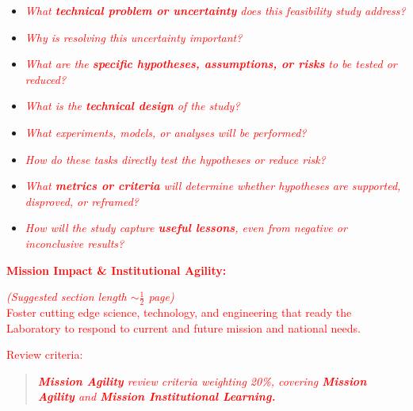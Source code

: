 \begin{itemize}[noitemsep,nolistsep]
    \item \textcolor{red}{\textit{What \textbf{technical problem or uncertainty} does this feasibility study address?}}
    \item \textcolor{red}{\textit{Why is resolving this uncertainty important?}}
    \item \textcolor{red}{\textit{What are the \textbf{specific hypotheses, assumptions, or risks} to be tested or reduced?}}
    \item \textcolor{red}{\textit{What is the \textbf{technical design} of the study?}}
    \item \textcolor{red}{\textit{What experiments, models, or analyses will be performed?}}
    \item \textcolor{red}{\textit{How do these tasks directly test the hypotheses or reduce risk?}}
    \item \textcolor{red}{\textit{What \textbf{metrics or criteria} will determine whether hypotheses are supported, disproved, or reframed?}}
    \item \textcolor{red}{\textit{How will the study capture \textbf{useful lessons}, even from negative or inconclusive results?}}
\end{itemize}
\vspace*{\baselineskip}

\textcolor{red}{\textbf{Mission Impact \& Institutional Agility:}}
\vspace*{0.5\baselineskip}

\textcolor{red}{\textit{(Suggested section length \(\sim \)$\frac{1}{2}$ page)}}\\
\textcolor{red}{Foster cutting edge science, technology, and engineering that ready the Laboratory to respond to current and future mission and national needs.}
\vspace*{\baselineskip}

\textcolor{red}{Review criteria:}\\
\begin{quote}
    \vspace{-0.4cm}\textcolor{red}{\textit{\textbf{Mission Agility} review criteria weighting 20\%, covering \textbf{Mission Agility} and \textbf{Mission Institutional Learning.}}}
\end{quote}

